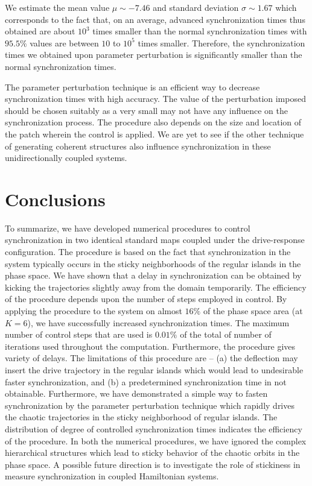 \documentclass[reprint,amsmath,amssymb,aps,pre]{revtex4-1}
\begin{document}
We estimate the mean value $\mu \sim -7.46$ and standard deviation $\sigma 
\sim1.67$ which corresponds to the fact that, on an average, advanced 
synchronization times thus obtained are about $10^3$ times smaller than the 
normal synchronization times with $95.5\%$ values are between $10$ to $10^5$ 
times smaller.  Therefore, the synchronization times we obtained upon 
parameter perturbation is significantly smaller than the normal 
synchronization times.

The parameter perturbation technique is an efficient way to decrease synchronization times with high accuracy.  The value of the perturbation imposed should be chosen suitably as a very small may not have any influence on the synchronization process. The procedure also depends on the size and location of the patch wherein the control is applied. We are yet to see if the other technique of generating coherent structures also influence synchronization in these unidirectionally coupled systems. 


\section{Conclusions}
\label{sec:conclusions}
To summarize, we have developed numerical procedures to control 
synchronization in two identical standard maps coupled under the 
drive-response configuration. The procedure is based on the fact that 
synchronization in the system typically occurs in the sticky neighborhoods of the regular islands in 
the phase space. We have shown that a delay in synchronization can be obtained 
by kicking the trajectories slightly away from the domain temporarily. The 
efficiency of the procedure depends upon the number of steps employed in 
control. By applying the procedure to the system on almost $16\%$ of the phase 
space area (at $K = 6$), we have successfully increased synchronization times. 
The maximum number of control steps that are used is $0.01\%$ of the total of 
number of iterations used throughout the computation.  Furthermore, the 
procedure gives variety of delays. The limitations of this procedure are -- (a) 
the deflection may insert the drive trajectory in the regular islands which 
would lead to undesirable faster synchronization, and (b) a predetermined 
synchronization time in not obtainable. Furthermore, we have demonstrated a 
simple way to fasten synchronization by the parameter perturbation technique 
which rapidly drives the chaotic trajectories in the sticky neighborhood of 
regular islands. The distribution of degree of controlled synchronization 
times indicates the efficiency of the procedure. In both the numerical 
procedures, we have ignored the complex hierarchical structures which lead to 
sticky behavior of the chaotic orbits in the phase space. A possible future 
direction is to investigate the role of stickiness in measure synchronization 
in coupled Hamiltonian systems.
\end{document}
